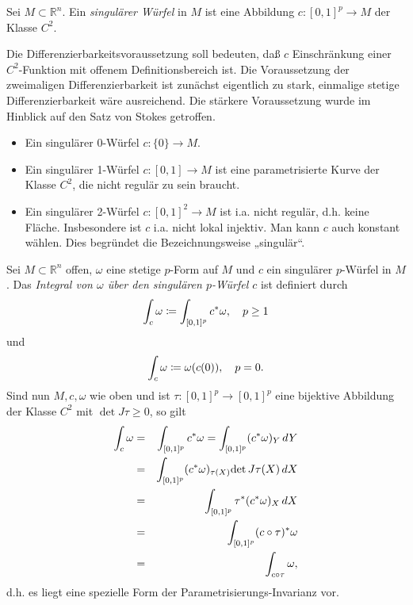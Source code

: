 \documentclass[a4paper,twoside,DIV15,BCOR12mm]{scrbook}
\begin{document}
\bigskip

 Sei $M \subset {\mathbb R}^{n}$. Ein 
{\em singulärer Würfel} in $M$ 
ist eine Abbildung $c: [0,1]^{p} \to M$ 
der Klasse $C^{2}$.

\bigskip

\noindent
Die Differenzierbarkeitsvoraussetzung soll bedeuten, daß $c$ 
Einschränkung einer $C^{2}$-Funktion mit offenem Definitionsbereich 
ist. Die Voraussetzung der zweimaligen Differenzierbarkeit ist zunächst eigentlich 
zu stark, einmalige stetige Differenzierbarkeit wäre ausreichend. Die stärkere 
Voraussetzung wurde im Hinblick auf den Satz von Stokes getroffen. 

\bigskip

\begin{itemize}
\item{} Ein singulärer 0-Würfel $c: \{0\} \to M$.
\item{} Ein singulärer 1-Würfel $c: [0,1] \to M$ ist eine parametrisierte Kurve 
der Klasse $C^{2}$, die nicht regulär zu sein braucht.
\item{} Ein singulärer 2-Würfel $c: [0,1]^{2} \to M$ ist i.a. nicht 
regulär, d.h. keine Fläche. Insbesondere ist $c$ i.a. nicht lokal 
injektiv. Man kann $c$ auch konstant wählen. Dies begründet die 
Bezeichnungsweise „singulär“.
\end{itemize}

\bigskip

 Sei $M \subset {\mathbb R}^{n}$ offen, 
$\omega$ eine stetige $p$-Form auf $M$ und $c$ ein singulärer 
$p$-Würfel in $M$. Das {\em Integral von $\omega$ über den singulären 
$p$-Würfel $c$} ist definiert durch
\[ \int_{c} \omega \da  \int_{[0,1]^{p}} c^{*}\omega, \quad p \ge 1 \]
und
\[ \int_{c} \omega \da  \omega(c(0)), \quad p = 0. \]
Sind nun  $M, c, \omega$ wie oben und ist $\tau: [0,1]^{p} \to [0,1]^{p}$ 
eine bijektive Abbildung der Klasse $C^{2}$ mit $\det J \tau 
\ge 0$, so gilt
\begin{eqnarray*}
\int_{c} \omega & = & \int_{[0,1]^{p}} c^{*} \omega = \int_{[0,1]^{p}} 
(c^{*}\omega)_{Y} \, dY \\
& = & \int_{[0,1]^{p}} (c^{*}\omega)_{\tau(X)} {\rm det}\, J\tau(X)\, 
dX \\
& = & \int_{[0,1]^{p}} \tau^{*}(c^{*}\omega)_{X}\, dX \\
& = & \int_{[0,1]^{p}} (c \circ \tau)^{*} \omega \\
& = & \int_{c \circ \tau} \omega,
\end{eqnarray*}
d.h. es liegt eine spezielle Form der Parametrisierungs-Invarianz vor.
\end{document}
